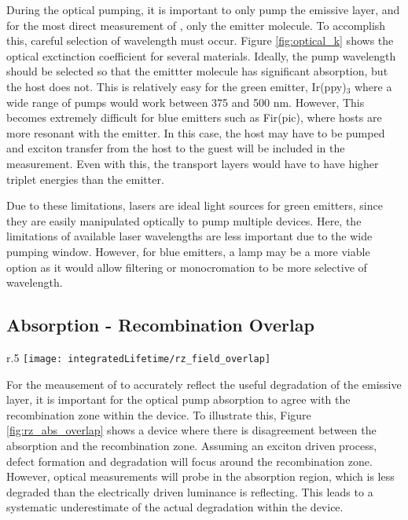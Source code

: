 \documentclass[../thesis.tex]{subfiles}
\begin{document}
During the optical pumping, it is important to only pump the emissive layer, and for the most direct measurement of \pl, only the emitter molecule.
To accomplish this, careful selection of wavelength must occur.  
Figure \ref{fig:optical_k} shows the optical exctinction coefficient for several materials.  
Ideally, the pump wavelength should be selected so that the emittter molecule has significant absorption, but the host does not.  
This is relatively easy for the green emitter, Ir(ppy)$_3$ where a wide range of pumps would work between 375 and 500 nm.
However, This becomes extremely difficult for blue emitters such as Fir(pic), where hosts are more resonant with the emitter.  
In this case, the host may have to be pumped and exciton transfer from the host to the guest will be included in the measurement.
Even with this, the transport layers would have to have higher triplet energies than the emitter.

Due to these limitations, lasers are ideal light sources for green emitters, since they are easily manipulated optically to pump multiple devices.
Here, the limitations of available laser wavelengths are less important due to the wide pumping window.
However, for blue emitters, a lamp may be a more viable option as it would allow filtering or monocromation to be more selective of wavelength.



\subsection{Absorption - Recombination Overlap}\label{sec:abs_rz_overlap}

\begin{wrapfigure}{r}{.5\textwidth}
\centering
\texttt{[image: integratedLifetime/rz\_field\_overlap]}
\caption{Exciton recombination zone (RZ) and pump intensity $|E|^2$ for a hypothetical thick EML device are shown.}
\label{fig:rz_abs_overlap}
\end{wrapfigure}


For the meausement of \pl to accurately reflect the useful degradation of the emissive layer, it is important for the optical pump absorption to agree with the recombination zone within the device.  
To illustrate this, Figure \ref{fig:rz_abs_overlap} shows a device where there is disagreement between the absorption and the recombination zone.  
Assuming an exciton driven process, defect formation and degradation will focus around the recombination zone.
However, optical measurements will probe in the absorption region, which is less degraded than the electrically driven luminance is reflecting.
This leads to a systematic underestimate of the actual \pl degradation within the device.
\end{document}
